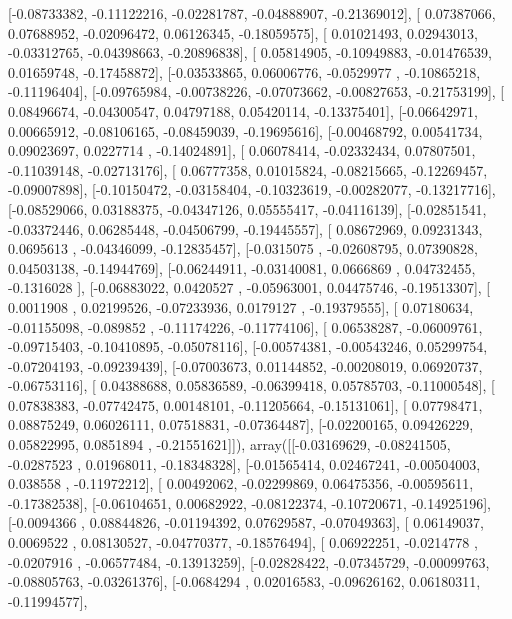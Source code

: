 \documentclass{article}
\begin{document}
       [-0.08733382, -0.11122216, -0.02281787, -0.04888907, -0.21369012],
       [ 0.07387066,  0.07688952, -0.02096472,  0.06126345, -0.18059575],
       [ 0.01021493,  0.02943013, -0.03312765, -0.04398663, -0.20896838],
       [ 0.05814905, -0.10949883, -0.01476539,  0.01659748, -0.17458872],
       [-0.03533865,  0.06006776, -0.0529977 , -0.10865218, -0.11196404],
       [-0.09765984, -0.00738226, -0.07073662, -0.00827653, -0.21753199],
       [ 0.08496674, -0.04300547,  0.04797188,  0.05420114, -0.13375401],
       [-0.06642971,  0.00665912, -0.08106165, -0.08459039, -0.19695616],
       [-0.00468792,  0.00541734,  0.09023697,  0.0227714 , -0.14024891],
       [ 0.06078414, -0.02332434,  0.07807501, -0.11039148, -0.02713176],
       [ 0.06777358,  0.01015824, -0.08215665, -0.12269457, -0.09007898],
       [-0.10150472, -0.03158404, -0.10323619, -0.00282077, -0.13217716],
       [-0.08529066,  0.03188375, -0.04347126,  0.05555417, -0.04116139],
       [-0.02851541, -0.03372446,  0.06285448, -0.04506799, -0.19445557],
       [ 0.08672969,  0.09231343,  0.0695613 , -0.04346099, -0.12835457],
       [-0.0315075 , -0.02608795,  0.07390828,  0.04503138, -0.14944769],
       [-0.06244911, -0.03140081,  0.0666869 ,  0.04732455, -0.1316028 ],
       [-0.06883022,  0.0420527 , -0.05963001,  0.04475746, -0.19513307],
       [ 0.0011908 ,  0.02199526, -0.07233936,  0.0179127 , -0.19379555],
       [ 0.07180634, -0.01155098, -0.089852  , -0.11174226, -0.11774106],
       [ 0.06538287, -0.06009761, -0.09715403, -0.10410895, -0.05078116],
       [-0.00574381, -0.00543246,  0.05299754, -0.07204193, -0.09239439],
       [-0.07003673,  0.01144852, -0.00208019,  0.06920737, -0.06753116],
       [ 0.04388688,  0.05836589, -0.06399418,  0.05785703, -0.11000548],
       [ 0.07838383, -0.07742475,  0.00148101, -0.11205664, -0.15131061],
       [ 0.07798471,  0.08875249,  0.06026111,  0.07518831, -0.07364487],
       [-0.02200165,  0.09426229,  0.05822995,  0.0851894 , -0.21551621]]), array([[-0.03169629, -0.08241505, -0.0287523 ,  0.01968011, -0.18348328],
       [-0.01565414,  0.02467241, -0.00504003,  0.038558  , -0.11972212],
       [ 0.00492062, -0.02299869,  0.06475356, -0.00595611, -0.17382538],
       [-0.06104651,  0.00682922, -0.08122374, -0.10720671, -0.14925196],
       [-0.0094366 ,  0.08844826, -0.01194392,  0.07629587, -0.07049363],
       [ 0.06149037,  0.0069522 ,  0.08130527, -0.04770377, -0.18576494],
       [ 0.06922251, -0.0214778 , -0.0207916 , -0.06577484, -0.13913259],
       [-0.02828422, -0.07345729, -0.00099763, -0.08805763, -0.03261376],
       [-0.0684294 ,  0.02016583, -0.09626162,  0.06180311, -0.11994577],
\end{document}

